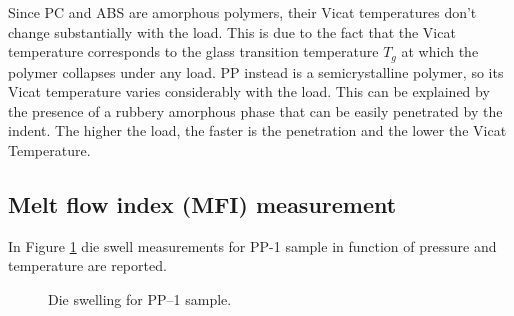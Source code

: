 \documentclass[a4paper, 11pt]{article}
\begin{document}
Since PC and ABS are amorphous polymers, their Vicat temperatures don't change substantially with the load. This is due to the fact that the Vicat temperature corresponds to the glass transition temperature $T_{g}$ at which the polymer collapses under any load.
PP instead is a semicrystalline polymer, so its Vicat temperature varies considerably with the load. This can be explained by the presence of a rubbery amorphous phase that can be easily penetrated by the indent. The higher the load, the faster is the penetration and the lower the Vicat Temperature. 
\newpage

\subsection{Melt flow index (MFI) measurement}

In Figure \ref{fig:dieswell} die swell measurements for PP-1 sample in function of pressure and temperature are reported.
\begin{figure}[h!]
	\centering
	 \quad 
	\captionsetup{justification=centering}
	\caption{Die swelling for PP–1 sample.}
	\label{fig:dieswell}
\end{figure}\\
\end{document}

